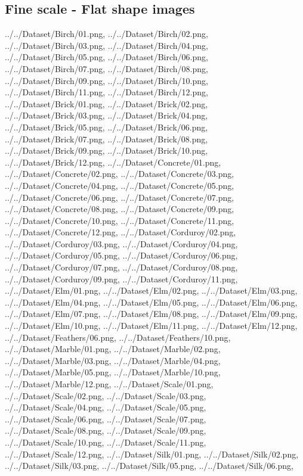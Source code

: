 \newpage
\subsection{Fine scale - Flat shape images}
{../../Dataset/Birch/01.png,
../../Dataset/Birch/02.png,
../../Dataset/Birch/03.png,
../../Dataset/Birch/04.png,
../../Dataset/Birch/05.png,
../../Dataset/Birch/06.png,
../../Dataset/Birch/07.png,
../../Dataset/Birch/08.png,
../../Dataset/Birch/09.png,
../../Dataset/Birch/10.png,
../../Dataset/Birch/11.png,
../../Dataset/Birch/12.png,
../../Dataset/Brick/01.png,
../../Dataset/Brick/02.png,
../../Dataset/Brick/03.png,
../../Dataset/Brick/04.png,
../../Dataset/Brick/05.png,
../../Dataset/Brick/06.png,
../../Dataset/Brick/07.png,
../../Dataset/Brick/08.png,
../../Dataset/Brick/09.png,
../../Dataset/Brick/10.png,
../../Dataset/Brick/12.png,
../../Dataset/Concrete/01.png,
../../Dataset/Concrete/02.png,
../../Dataset/Concrete/03.png,
../../Dataset/Concrete/04.png,
../../Dataset/Concrete/05.png,
../../Dataset/Concrete/06.png,
../../Dataset/Concrete/07.png,
../../Dataset/Concrete/08.png,
../../Dataset/Concrete/09.png,
../../Dataset/Concrete/10.png,
../../Dataset/Concrete/11.png,
../../Dataset/Concrete/12.png,
../../Dataset/Corduroy/02.png,
../../Dataset/Corduroy/03.png,
../../Dataset/Corduroy/04.png,
../../Dataset/Corduroy/05.png,
../../Dataset/Corduroy/06.png,
../../Dataset/Corduroy/07.png,
../../Dataset/Corduroy/08.png,
../../Dataset/Corduroy/09.png,
../../Dataset/Corduroy/11.png,
../../Dataset/Elm/01.png,
../../Dataset/Elm/02.png,
../../Dataset/Elm/03.png,
../../Dataset/Elm/04.png,
../../Dataset/Elm/05.png,
../../Dataset/Elm/06.png,
../../Dataset/Elm/07.png,
../../Dataset/Elm/08.png,
../../Dataset/Elm/09.png,
../../Dataset/Elm/10.png,
../../Dataset/Elm/11.png,
../../Dataset/Elm/12.png,
../../Dataset/Feathers/06.png,
../../Dataset/Feathers/10.png,
../../Dataset/Marble/01.png,
../../Dataset/Marble/02.png,
../../Dataset/Marble/03.png,
../../Dataset/Marble/04.png,
../../Dataset/Marble/05.png,
../../Dataset/Marble/10.png,
../../Dataset/Marble/12.png,
../../Dataset/Scale/01.png,
../../Dataset/Scale/02.png,
../../Dataset/Scale/03.png,
../../Dataset/Scale/04.png,
../../Dataset/Scale/05.png,
../../Dataset/Scale/06.png,
../../Dataset/Scale/07.png,
../../Dataset/Scale/08.png,
../../Dataset/Scale/09.png,
../../Dataset/Scale/10.png,
../../Dataset/Scale/11.png,
../../Dataset/Scale/12.png,
../../Dataset/Silk/01.png,
../../Dataset/Silk/02.png,
../../Dataset/Silk/03.png,
../../Dataset/Silk/05.png,
../../Dataset/Silk/06.png,
}
